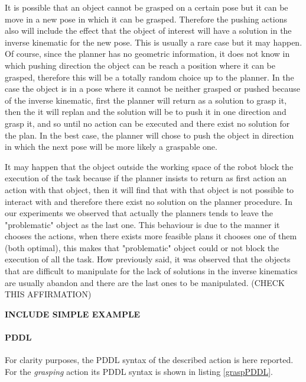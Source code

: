 It is possible that an object cannot be grasped on a certain pose but it can be move in a new pose in which it can be grasped. Therefore the pushing actions also will include the effect that the object of interest will have a solution in the inverse kinematic for the new pose. This is usually a rare case but it may happen. Of course, since the planner has no geometric information, it does not know in which pushing direction the object can be reach a position where it can be grasped, therefore this will be a totally random choice up to the planner. In the case the object is in a pose where it cannot be neither grasped or pushed because of the inverse kinematic, first the planner will return as a solution to grasp it, then the it will replan and the solution will be to push it in one direction and grasp it, and so until no action can be executed and there exist no solution for the plan. In the best case, the planner will chose to push the object in direction in which the next pose will be more likely a graspable one. 

It may happen that the object outside the working space of the robot block the execution of the task because if the planner insists to return as first action an action with that object, then it will find that with that object is not possible to interact with and therefore there exist no solution on the planner procedure. In our experiments we observed that actually the planners tends to leave the "problematic" object as the last one. This behaviour is due to the manner it chooses the actions, when there exists more feasible plans it chooses one of them (both optimal), this makes that "problematic" object could or not block the execution of all the task. How previously said, it was observed that the objects that are difficult to manipulate for the lack of solutions in the inverse kinematics are usually abandon and there are the last ones to be manipulated. (CHECK THIS AFFIRMATION)



\textbf{INCLUDE SIMPLE EXAMPLE}

\paragraph{PDDL}
For clarity purposes, the PDDL syntax of the described action is here reported. 
For the \textit{grasping} action its PDDL syntax is shown in listing \ref{graspPDDL}.

